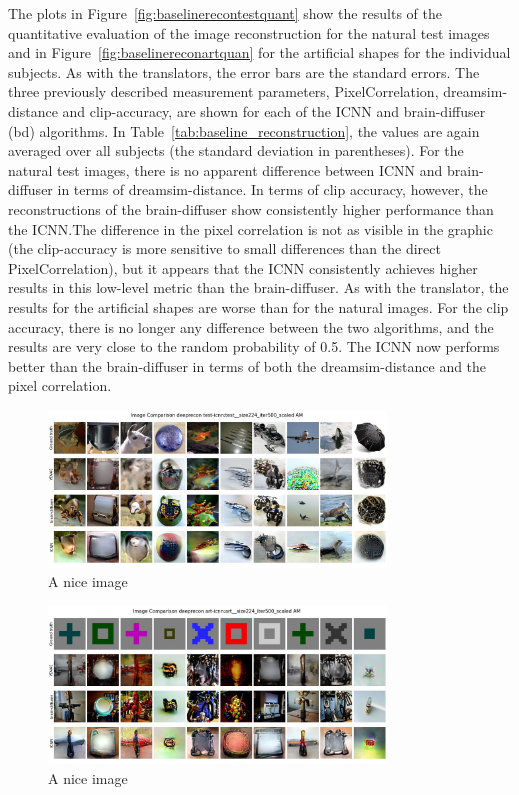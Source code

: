 The plots in Figure~\ref{fig:baselinerecontestquant} show the results of the quantitative evaluation of the image reconstruction for the natural test images and in Figure~\ref{fig:baselinereconartquan} for the artificial shapes for the individual subjects. As with the translators, the error bars are the standard errors. The three previously described measurement parameters, PixelCorrelation, dreamsim-distance and clip-accuracy, are shown for each of the ICNN and brain-diffuser (bd) algorithms. In Table~\ref{tab:baseline_reconstruction}, the values are again averaged over all subjects (the standard deviation in parentheses). For the natural test images, there is no apparent difference between ICNN and brain-diffuser in terms of dreamsim-distance. In terms of clip accuracy, however, the reconstructions of the brain-diffuser show consistently higher performance than the ICNN.\@ The difference in the pixel correlation is not as visible in the graphic (the clip-accuracy is more sensitive to small differences than the direct PixelCorrelation), but it appears that the ICNN consistently achieves higher results in this low-level metric than the brain-diffuser. As with the translator, the results for the artificial shapes are worse than for the natural images. For the clip accuracy, there is no longer any difference between the two algorithms, and the results are very close to the random probability of 0.5. The ICNN now performs better than the brain-diffuser in terms of both the dreamsim-distance and the pixel correlation. 


\begin{figure}[ht]
    \centering
    \includegraphics[width=0.8\textwidth]{plots/baseline_recon_test.JPEG}
    \caption{A nice image}\label{fig:baselinerecontestqual}
\end{figure}

\begin{figure}[ht]
    \centering
    \includegraphics[width=0.8\textwidth]{plots/baseline_recon_art.JPEG}
    \caption{A nice image}\label{fig:baselinereconartqual}
\end{figure}


